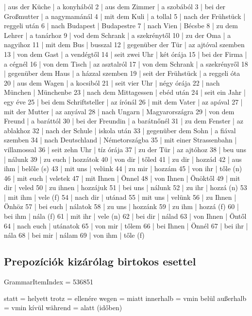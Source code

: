 \documentclass{article}
\newenvironment{desc}{\verbatim}{\endverbatim}
\newenvironment{exmp}{\verbatim}{\endverbatim}
\begin{document}
\begin{exmp}
1 | aus der Küche | a konyhából
2 | aus dem Zimmer | a szobából
3 | bei der Großmutter | a nagymamánál
4 | mit dem Kuli | a tollal
5 | nach der Frühstück | reggeli után
6 | nach Budapest | Budapestre
7 | nach Vien | Bécsbe
8 | zu dem Lehrer | a tanárhoz
9 | vod dem Schrank | a szekrénytől
10 | zu der Oma | a nagyihoz
11 | mit dem Bus | busszal
12 | gegenüber der Tür | az ajtóval szemben
13 | von dem Gast | a vendégtől
14 | seit zwei Uhr | két órája
15 | bei der Firma | a cégnél
16 | von dem Tisch | az asztalról
17 | von dem Schrank | a szekrényről
18 | gegenüber dem Haus | a házzal szemben
19 | seit der Frühstück | a reggeli óta
20 | aus dem Wagen | a kocsiból
21 | seit vier Uhr | négy órája
22 | nach München | Münchenbe
23 | nach dem Mittagessen | ebéd után
24 | seit ein Jahr | egy éve
25 | bei dem Schriftsteller | az írónál
26 | mit dem Vater | az apával
27 | mit der Mutter | az anyával
28 | nach Ungarn | Magyarországra
29 | von dem Freund | a baráttól
30 | bei der Freundin | a barátnőnél
31 | zu dem Fenster | az ablakhoz
32 | nach der Schule | iskola után
33 | gegenüber dem Sohn | a fiával szemben
34 | nach Deutschland | Németországba
35 | mit einer Strassenbahn | villamossal
36 | seit zehn Uhr | tíz órája
37 | zu der Tür | az ajtóhoz
38 | beu uns | nálunk
39 | zu euch | hozzátok
40 | von dir | tőled
41 | zu dir | hozzád
42 | aus ihm | belőle (s)
43 | mit uns | velünk
44 | zu mir | hozzám
45 | von ihr | tőle (n)
46 | mit euch | veletek
47 | mit Ihnen | Önnel
48 | von Ihnen | Önöktől
49 | mit dir | veled
50 | zu ihnen | hozzájuk
51 | bei uns | nálunk
52 | zu ihr | hozzá (n)
53 | mit ihm | vele (f)
54 | nach dir | utánad
55 | mit uns | velünk
56 | zu Ihnen | Önhöz
57 | bei euch | nálatok
58 | zu uns | hozzánk
59 | zu ihm | hozzá (f)
60 | bei ihm | nála (f)
61 | mit ihr | vele (n)
62 | bei dir | nálad
63 | von Ihnen | Öntől
64 | nach euch | utánatok
65 | von mir | tőlem
66 | bei Ihnen | Önnél
67 | bei ihr | nála
68 | bei mir | nálam
69 | von ihm | tőle (f)
\end{exmp}

\subsection{Prepozíciók kizárólag birtokos esettel}

GrammarItemIndex = 536851

\begin{desc}
\begin{enumerate}
statt = helyett
trotz = ellenére
wegen = miatt
innerhalb = vmin belül
außerhalb = vmin kívül
während = alatt (időben)
\end{enumerate}
\end{desc}
\end{document}
